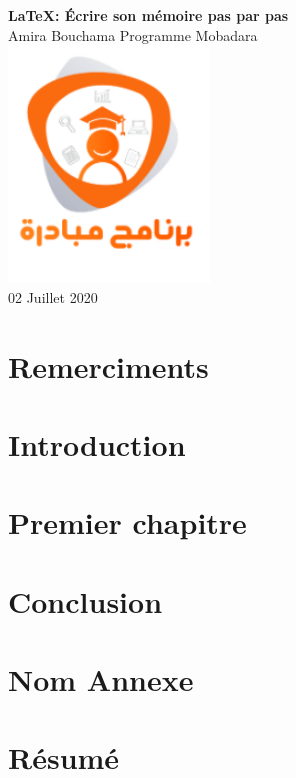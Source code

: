 \documentclass[a4paper,12pt]{report}
\begin{document}
\begin{titlepage}
    \begin{center}
        \vspace*{1cm}
        \Huge
        \vspace{0.5cm}
        \LARGE
        \textbf{LaTeX: Écrire son mémoire pas par pas}\\
        \vspace{1.5cm}
        \Large
		Amira Bouchama
        \vfill
        \large
		Programme Mobadara\\
 		 \vspace{0.8cm}
 		 \includegraphics[width=0.4\textwidth]{MobadaraProgram}\\
         \small
        02 Juillet 2020
    \end{center}
\end{titlepage}
\newpage
\chapter*{Remerciments}

\tableofcontents
\listoffigures
\listoftables
\chapter*{Introduction}

\chapter{Premier chapitre}

\chapter*{Conclusion}

\appendix
\chapter{Nom Annexe}

\printbibliography
\chapter*{Résumé}

\end{document}
